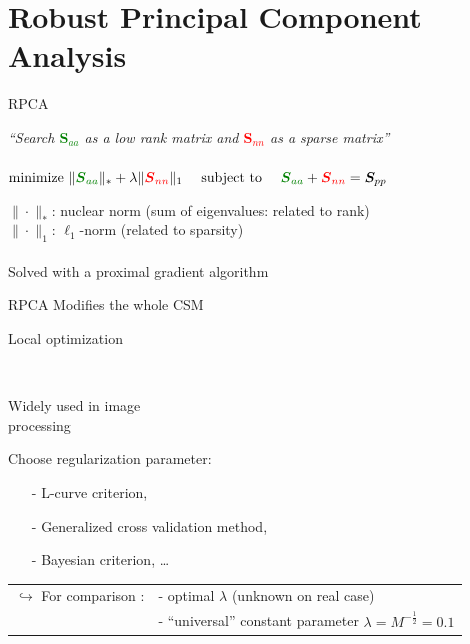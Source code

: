 \documentclass[10pt,xcolor=x11names,compress, notes=show]{beamer}%
\newcommand{\citeTransp}[1]{\color{fg!50} \citep{#1}}
\begin{document}
\section{Robust Principal Component Analysis}
\begin{frame}
\end{frame}
\begin{frame}{RPCA}
	\vspace{-0.5cm}
	\begin{center}
		\textit{``Search \textcolor{green}{$\bm{S}_{aa}$} as a low rank matrix and \textcolor{red}{$\bm{S}_{nn}$} as a sparse matrix''}\\~\\
		\colorbox{gray!20}{
		 $\text{minimize~} \|\textcolor{green}{\bm{{S}}_{aa}} \|_* + \lambda \| \textcolor{red}{\bm{{S}}_{nn}} \|_1  \text{~~~~subject to~~~~} \textcolor{green}{ \bm{{S}}_{aa}} +  \textcolor{red}{\bm{{S}}_{nn}} = \bm{S}_{pp}$
		}
	\end{center}


	
	$\| \cdot \|_*$: nuclear norm (sum of eigenvalues: related to rank)\\
	$\| \cdot \|_1$: $\ell_1$-norm (related to sparsity)\\~\\
	
	Solved with a proximal gradient algorithm
	\vfill

	\begin{block}{RPCA  \citeTransp{Wright2009a}}
		 Modifies the whole CSM		\hfill\parbox{0.56\linewidth}{ Local optimization}\\[2pt]
		\parbox{0.42\linewidth}{ Widely used in image\\ processing}\hfill\parbox{0.56\linewidth}{ Choose regularization parameter:
		\small
		\begin{itemize}
			\setlength{\itemindent}{0.3cm}
		        \item[-] L-curve criterion,\\[-2pt]
		        \item[-] Generalized cross validation method,\\[-2pt]
		       \item[-] Bayesian criterion, \dots
		\end{itemize}
		}
	\end{block}
	\vfill
	\begin{tabular}{rl}
	$\hookrightarrow$ For comparison :& - optimal $\lambda$  (unknown on real case)\\
	& - ``universal'' constant  parameter $\lambda=M^{-\frac{1}{2}}=0.1$
	\end{tabular}

\end{frame}
\end{document}
